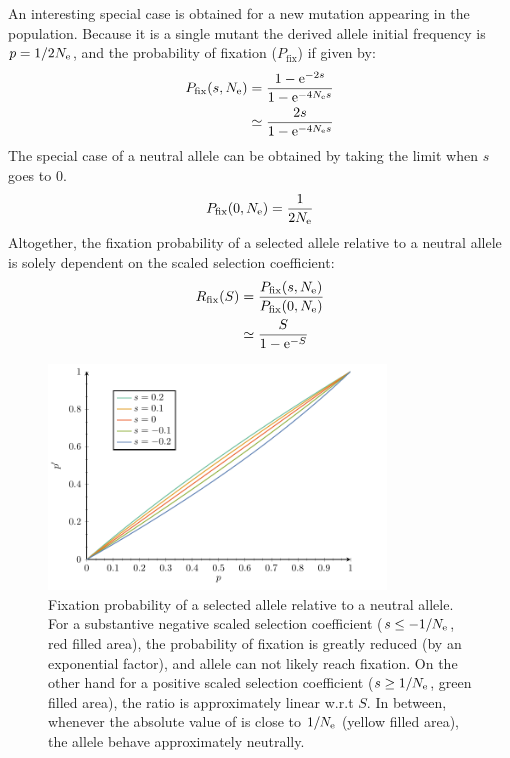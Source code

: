 An interesting special case is obtained for a new mutation appearing in the population.
Because it is a single mutant the derived \gls{allele} initial frequency is $p = 1 / 2 N_{\textrm{e}}$, and the probability of fixation ($P_{\mathrm{fix}}$) if given by:
\begin{align}
	P_{\mathrm{fix}}(s, N_{\textrm{e}}) & = \dfrac{1 - \mathrm{e}^{-2 s}}{1 - \mathrm{e}^{-4 N_{\textrm{e}} s}} \\
	 & \simeq  \dfrac{2 s }{1 - \mathrm{e}^{-4 N_{\textrm{e}} s}}
\end{align}
The special case of a \gls{neutral} \gls{allele} can be obtained by taking the limit when $s$ goes to $0$.
\begin{align}
P_{\mathrm{fix}}(0, N_{\textrm{e}}) & = \dfrac{1}{2 N_{\textrm{e}}} \\
\end{align}
Altogether, the fixation probability of a selected \gls{allele} relative to a \gls{neutral} \gls{allele} is solely dependent on the scaled selection coefficient:
\begin{align}
R_{\mathrm{fix}}(S) & = \dfrac{P_{\mathrm{fix}}(s, N_{\textrm{e}})}{P_{\mathrm{fix}}(0, N_{\textrm{e}})} \\
& \simeq  \dfrac{S}{1 - \mathrm{e}^{-S}}
\end{align}
\begin{figure}[H]
	\begin{center}
		\includegraphics[width=0.8\textwidth, page=2] {figures.pdf}
	\end{center}
	\caption[Relative fixation probability]{Fixation probability of a selected \gls{allele} relative to a \gls{neutral} \gls{allele}.
	For a substantive negative scaled selection coefficient ($s \leq -1/N_{\textrm{e}}$, red filled area), the probability of fixation is greatly reduced (by an exponential factor), and \gls{allele} can not likely reach fixation. On the other hand for a positive scaled selection coefficient ($s \geq 1 / N_{\textrm{e}}$, green filled area), the ratio is approximately linear w.r.t $S$. In between, whenever the absolute value of is close to $1 / N_{\textrm{e}}$ (yellow filled area), the \gls{allele} behave approximately neutrally.}
\end{figure}

